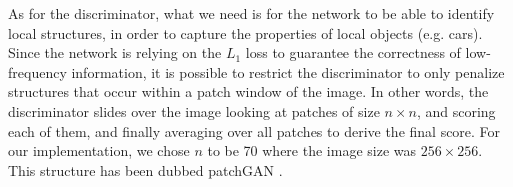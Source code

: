 As for the discriminator, what we need is for the network to be able to identify local structures, in order to capture the properties of local objects (e.g. cars). Since the network is relying on the $L_1$ loss to guarantee the correctness of low-frequency information, it is possible to restrict the discriminator to only penalize structures that occur within a patch window of the image. In other words, the discriminator slides over the image looking at patches of size $n \times n$, and scoring each of them, and finally averaging over all patches to derive the final score. For our implementation, we chose $n$ to be 70 where the image size was $256 \times 256$. This structure has been dubbed patchGAN \cite{pix2pix}.